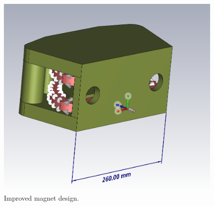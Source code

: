 \documentclass[a4paper,oneside,12pt]{report}
\numberwithin{equation}{chapter}
\begin{document}
\begin{figure}[H]
    \centering
    \captionsetup{justification=centering}
    \includegraphics[width=.7\linewidth]{./figures/cst/cst_second_magnet_design1.png}
    \caption{Improved magnet design.}
    \label{fig:improved_magnet_design}
\end{figure}
\end{document}
